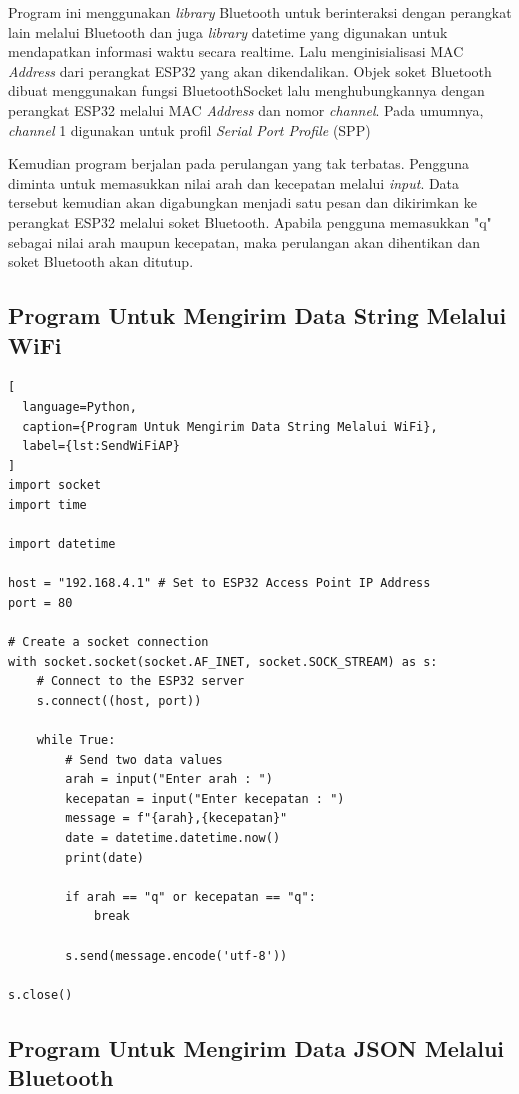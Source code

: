 Program ini menggunakan \emph{library} Bluetooth untuk berinteraksi dengan perangkat lain melalui Bluetooth dan juga \emph{library} datetime yang digunakan untuk mendapatkan informasi waktu secara realtime. Lalu menginisialisasi MAC \emph{Address} dari perangkat ESP32 yang akan dikendalikan. Objek soket Bluetooth dibuat menggunakan fungsi BluetoothSocket lalu menghubungkannya dengan perangkat ESP32 melalui MAC \emph{Address} dan nomor \emph{channel}. Pada umumnya, \emph{channel} 1 digunakan untuk profil \emph{Serial Port Profile} (SPP)

Kemudian program berjalan pada perulangan yang tak terbatas. Pengguna diminta untuk memasukkan nilai arah dan kecepatan melalui \emph{input}. Data tersebut kemudian akan digabungkan menjadi satu pesan dan dikirimkan ke perangkat ESP32 melalui soket Bluetooth. Apabila pengguna memasukkan "q" sebagai nilai arah maupun kecepatan, maka perulangan akan dihentikan dan soket Bluetooth akan ditutup.

\subsection{Program Untuk Mengirim Data String Melalui WiFi}

\begin{lstlisting}[
  language=Python,
  caption={Program Untuk Mengirim Data String Melalui WiFi},
  label={lst:SendWiFiAP}
]
import socket
import time

import datetime

host = "192.168.4.1" # Set to ESP32 Access Point IP Address
port = 80

# Create a socket connection
with socket.socket(socket.AF_INET, socket.SOCK_STREAM) as s:
    # Connect to the ESP32 server
    s.connect((host, port))
    
    while True:
        # Send two data values
        arah = input("Enter arah : ")
        kecepatan = input("Enter kecepatan : ")
        message = f"{arah},{kecepatan}"
        date = datetime.datetime.now()
        print(date)
    
        if arah == "q" or kecepatan == "q":
            break
    
        s.send(message.encode('utf-8'))
        
s.close()

\end{lstlisting}

\subsection{Program Untuk Mengirim Data JSON Melalui Bluetooth}

